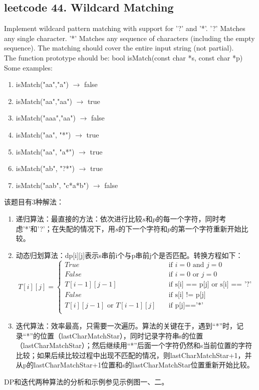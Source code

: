 \documentclass[a4paper,10pt]{article}
\begin{document}
\subsection{leetcode 44. Wildcard Matching}
Implement wildcard pattern matching with support for '?' and '*'. '?' Matches any single character. '*' Matches any sequence of characters (including the empty sequence). The matching should cover the entire input string (not partial).\\

\noindent The function prototype should be:
bool isMatch(const char *s, const char *p) \\

\noindent Some examples:
\begin{enumerate}
    \item isMatch("aa","a") $\to$ false
    \item isMatch("aa","aa") $\to$ true
    \item isMatch("aaa","aa") $\to$ false
    \item isMatch("aa", "*") $\to$ true
    \item isMatch("aa", "a*") $\to$ true
    \item isMatch("ab", "?*") $\to$ true
    \item isMatch("aab", "c*a*b") $\to$ false
\end{enumerate}

\begin{CJK*}{UTF8}{gbsn}
\noindent 该题目有3种解法：
\begin{enumerate}
    \item 递归算法：最直接的方法：依次进行比较$s$和$p$的每一个字符，同时考虑'*'和'?'；在失配的情况下，用$s$的下一个字符和$p$的第一个字符重新开始比较。
    
    \item 动态归划算法：dp[i][j]表示s串前i个与p串前j个是否匹配。转换方程如下：
        \[ T[i][j] =
            \begin{cases}
                True        & \quad \text{if } i=0 \text{ and } j=0\\
                False       & \quad \text{if } i=0 \text{ or } j=0\\
                T[i-1][j-1] & \quad \text{if s[i] == p[j] or s[i] == '?'}\\
                False       & \quad \text{if s[i] != p[j]}\\
                T[i][j-1] \text{ or } T[i-1][j]  & \quad \text{if p[j]=='*'}\\
            \end{cases}
        \]
        
    \item 迭代算法：效率最高，只需要一次遍历。算法的关键在于，遇到“*”时，记录“*”的位置（lastCharMatchStar），同时记录字符串s的位置（lastCharMatchStar）；然后继续用“*”后面一个字符仍然和s当前位置的字符比较；如果后续比较过程中出现不匹配的情况，则lastCharMatchStar+1，并从p的lastCharMatchStar+1位置和s的lastCharMatchStar位置重新开始比较。
\end{enumerate}
DP和迭代两种算法的分析和示例参见示例图一、二。
\end{CJK*}
\end{document}
